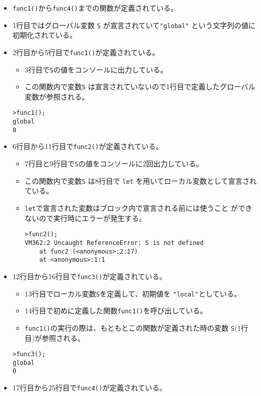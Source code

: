 \begin{itemize}
 \item \Verb+func1()+から\Verb+func4()+までの関数が定義されている。
 \item 1行目ではグローバル変数 \Verb+S+ が宣言されていて\Verb+"global"+
       という文字列の値に初期化されている。
 \item 2行目から5行目で\Verb+func1()+が定義されている。
\begin{itemize}
 \item 3行目で\Verb+S+の値をコンソールに出力している。
 \item この関数内で変数\Verb+S+
       は宣言されていないので1行目で定義したグローバル変数が参照される。
\end{itemize}       
\begin{Verbatim}
>func1();
global
0
\end{Verbatim}
 \item 6行目から11行目で\Verb+func2()+が定義されている。
\begin{itemize}
 \item 7行目と9行目で\Verb+S+の値をコンソールに2回出力している。
 \item この関数内で変数\Verb+S+ は8行目で
       \Verb+let+ を用いてローカル変数として宣言されている。
  \item \Verb+let+で宣言された変数はブロック内で宣言される前には使うこと
       ができないので実行時にエラーが発生する。
\begin{Verbatim}
>func2();
VM362:2 Uncaught ReferenceError: S is not defined
    at func2 (<anonymous>:2:17)
    at <anonymous>:1:1
\end{Verbatim}
\end{itemize}
 \item 12行目から16行目で\Verb+func3()+が定義されている。
\begin{itemize}
 \item 13行目でローカル変数\Verb+S+を定義して、初期値を
       \Verb+"local"+としている。
 \item 14行目で初めに定義した関数\Verb+func1()+を呼び出している。
 \item \Verb+func1()+の実行の際は、もともとこの関数が定義された時の変数
       \Verb+S+(1行目)が参照される。
\end{itemize}
\begin{Verbatim}
>func3();
global
0
\end{Verbatim}
 \item 17行目から25行目で\Verb+func4()+が定義されている。
\begin{itemize}

\end{itemize}
\end{itemize}
